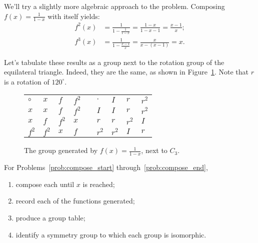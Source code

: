 \documentclass[../gatm.tex]{subfiles}
\begin{document}
We'll try a slightly more algebraic approach to the problem. Composing $f(x)=\frac{1}{1-x}$ with itself yields:
\begin{align*}
f^2(x)&=\frac{1}{1-\frac{1}{1-x}}=\frac{1-x}{1-x-1}=\frac{x-1}{x}; \\
f^3(x)&=\frac{1}{1-\frac{x-1}{x}}=\frac{x}{x-(x-1)}=x.
\end{align*}

Let's tabulate these results as a group next to the rotation group of the equilateral triangle. Indeed, they are the same, as shown in Figure~\ref{fig:vs_cyclic_3}. Note that $r$ is a rotation of $120^\circ$.

\begin{figure}[h]
\begin{center}
\renewcommand*{\arraystretch}{1.2}
\begin{tabular}{l|l|l|l|ll|l|l|l|}
$\circ$  & $x$   & $f$   & $f^2$ &  & $\cdot$ & $I$   & $r$   & $r^2$ \\ \cline{1-4} \cline{6-9}
$x$   & $x$   & $f$   & $f^2$ &  & $I$   & $I$   & $r$   & $r^2$ \\ \cline{1-4} \cline{6-9}
$x$   & $f$   & $f^2$ & $x$   &  & $r$   & $r$   & $r^2$ & $I$   \\ \cline{1-4} \cline{6-9}
$f^2$ & $f^2$ & $x$   & $f$   &  & $r^2$ & $r^2$ & $I$   & $r$   \\ \cline{1-4} \cline{6-9}
\end{tabular}
\end{center}
\caption{The group generated by $f(x)=\frac{1}{1-x}$, next to $C_3$.}
\label{fig:vs_cyclic_3}
\end{figure}

For Problems~\ref{prob:compose_start} through~\ref{prob:compose_end},
\begin{enumerate}[label=\roman*.]
\item compose each until $x$ is reached;
\item record each of the functions generated;
\item produce a group table;
\item identify a symmetry group to which each group is isomorphic.
\end{enumerate}
\end{document}
